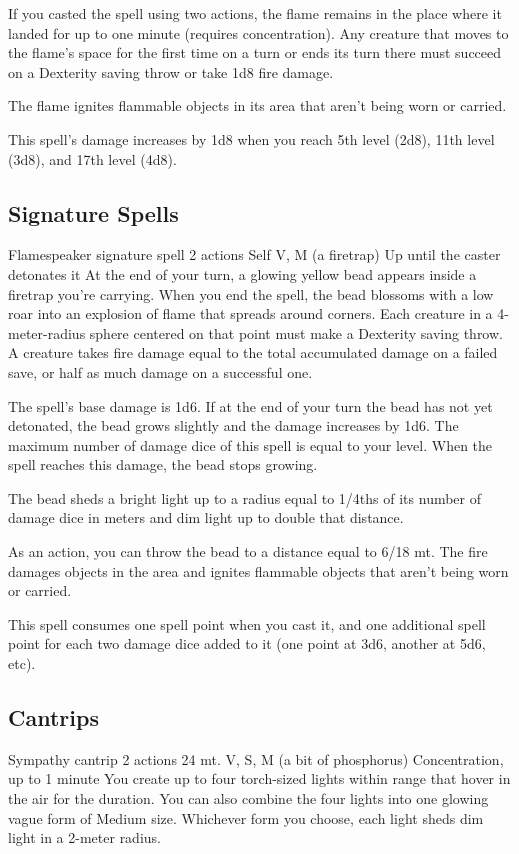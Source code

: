         If you casted the spell using two actions, the flame remains in the place where it landed for up to one minute (requires concentration).
        Any creature that moves to the flame's space for the first time on a turn or ends its turn there must succeed on a Dexterity saving throw or take 1d8 fire damage.

        The flame ignites flammable objects in its area that aren't being worn or carried.

        This spell's damage increases by 1d8 when you reach 5th level (2d8), 11th level (3d8), and 17th level (4d8).
\subsection*{Signature Spells}
        {Flamespeaker signature spell}
        {2 actions}
        {Self}
        {V, M (a firetrap)}
        {Up until the caster detonates it}
        At the end of your turn, a glowing yellow bead appears inside a firetrap you're carrying.
        When you end the spell, the bead blossoms with a low roar into an explosion of flame that spreads around corners.
        Each creature in a 4-meter-radius sphere centered on that point must make a Dexterity saving throw.
        A creature takes fire damage equal to the total accumulated damage on a failed save, or half as much damage on a successful one.

        The spell's base damage is 1d6.
        If at the end of your turn the bead has not yet detonated, the bead grows slightly and the damage increases by 1d6.
        The maximum number of damage dice of this spell is equal to your level.
        When the spell reaches this damage, the bead stops growing.

        The bead sheds a bright light up to a radius equal to 1/4ths of its number of damage dice in meters and dim light up to double that distance.

        As an action, you can throw the bead to a distance equal to 6/18 mt.
        The fire damages objects in the area and ignites flammable objects that aren't being worn or carried.

        This spell consumes one spell point when you cast it, and one additional spell point for each two damage dice added to it (one point at 3d6, another at 5d6, etc).
\subsection*{Cantrips}
        {Sympathy cantrip}
        {2 actions}
        {24 mt.}
        {V, S, M (a bit of phosphorus)}
        {Concentration, up to 1 minute}
        You create up to four torch-sized lights within range that hover in the air for the duration.
        You can also combine the four lights into one glowing vague form of Medium size.
        Whichever form you choose, each light sheds dim light in a 2-meter radius.

